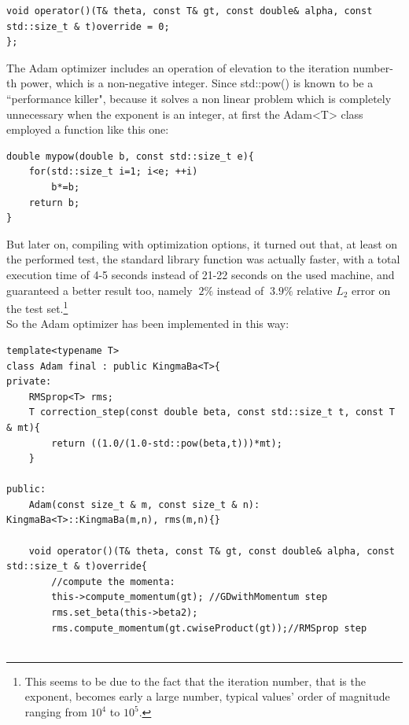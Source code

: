 \documentclass[12pt, a4paper]{report}
\theoremstyle{definition}
\begin{document}
{\begin{lstlisting}[frame=single]
	void operator()(T& theta, const T& gt, const double& alpha, const std::size_t & t)override = 0;
};
\end{lstlisting}
\noindent The Adam optimizer includes an operation of elevation to the iteration number-th power, which is a non-negative integer. Since {\ttfamily std::pow()} is known to be a ``performance killer", because it solves a non linear problem which is completely unnecessary when the exponent is an integer, at first the {\ttfamily Adam<T>} class employed a function like this one:
\begin{lstlisting}[frame=single]
double mypow(double b, const std::size_t e){
	for(std::size_t i=1; i<e; ++i)
		b*=b;
	return b;	
}
\end{lstlisting}
But later on, compiling with optimization options, it turned out that, at least on the performed test, the standard library function was actually faster, with a total execution time of 4-5 seconds instead of 21-22 seconds on the used machine, and guaranteed a better result too, namely $~2\%$ instead of $~3.9\%$ relative $L_2$ error on the test set.\footnote{This seems to be due to the fact that the iteration number, that is the exponent, becomes early a large number, typical values' order of magnitude ranging from $10^4$ to $10^5$.}\\
So the Adam optimizer has been implemented in this way:
\begin{lstlisting}[frame=single, showstringspaces=false]
template<typename T>
class Adam final : public KingmaBa<T>{
private:
	RMSprop<T> rms;
	T correction_step(const double beta, const std::size_t t, const T & mt){
		return ((1.0/(1.0-std::pow(beta,t)))*mt);
	}

public:
	Adam(const size_t & m, const size_t & n): KingmaBa<T>::KingmaBa(m,n), rms(m,n){}

	void operator()(T& theta, const T& gt, const double& alpha, const std::size_t & t)override{
		//compute the momenta:
		this->compute_momentum(gt);	//GDwithMomentum step
		rms.set_beta(this->beta2);
		rms.compute_momentum(gt.cwiseProduct(gt));//RMSprop step


\end{lstlisting}}
\end{document}
